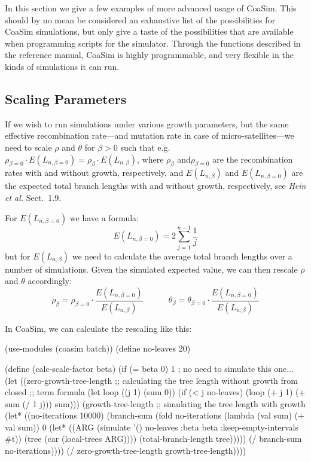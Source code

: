 \documentclass{manual}
\begin{document}
\begin{empfile}
In this section we give a few examples of more advanced usage of
CoaSim.  This should by no mean be considered an exhaustive list of
the possibilities for CoaSim simulations, but only give a taste of the
possibilities that are available when programming scripts for the
simulator.  Through the functions described in the reference manual,
CoaSim is highly programmable, and very flexible in the kinds of
simulations it can run.


\subsection{Scaling Parameters}
\label{sec:scaling-parameters}

If we wish to run simulations under various growth parameters, but the
same effective recombination rate---and mutation rate in case of
micro-satellites---we need to scale $\rho$ and $\theta$ for $\beta>0$
such that e.g.\ 
$\rho_{\beta=0}\cdot{}E(L_{n,\beta=0})=\rho_\beta\cdot{}E(L_{n,\beta})$,
where $\rho_\beta$ and$\rho_{\beta=0}$ are the recombination rates
with and without growth, respectively, and $E(L_{n,\beta})$ and
$E(L_{n,\beta=0})$ are the expected total branch lengths with and
without growth, respectively, see \emph{Hein et al.} Sect.~1.9.

For $E(L_{n,\beta=0})$ we have a formula:
\begin{equation}
  \label{eq:1}
  E(L_{n,\beta=0})=2\sum_{j=1}^{n-1}\frac{1}{j}
\end{equation}
but for $E(L_{n,\beta})$ we need to calculate the average total branch
lengths over a number of simulations.  Given the simulated expected
value, we can then rescale $\rho$ and $\theta$ accordingly: 
\[\rho_\beta=\rho_{\beta=0}\cdot\frac{E(L_{n,\beta=0})}{E(L_{n,\beta})}
  \quad\quad\quad
  \theta_\beta=\theta_{\beta=0}\cdot\frac{E(L_{n,\beta=0})}{E(L_{n,\beta})}
\]

In CoaSim, we can calculate the rescaling like this:
\begin{code}
(use-modules (coasim batch))
(define no-leaves    20)

(define (calc-scale-factor beta)
  (if (= beta 0) 1 ; no need to simulate this one...
      (let ((zero-growth-tree-length
             ;; calculating the tree length without growth from closed
             ;; term formula
             (let loop ((j 1) (sum 0))
               (if (< j no-leaves)
                   (loop (+ j 1) (+ sum (/ 1 j)))
                   sum)))
            (growth-tree-length
             ;; simulating the tree length with growth
             (let* ((no-iterations 10000)
                    (branch-sum
                     (fold no-iterations (lambda (val sum) (+ val sum)) 0
                           (let* ((ARG (simulate '() no-leaves :beta beta
                                                 :keep-empty-intervals #t))
                                  (tree (car (local-trees ARG))))
                             (total-branch-length tree)))))
               (/ branch-sum no-iterations))))
        (/ zero-growth-tree-length growth-tree-length))))


\end{code}
\end{empfile}
\end{document}
